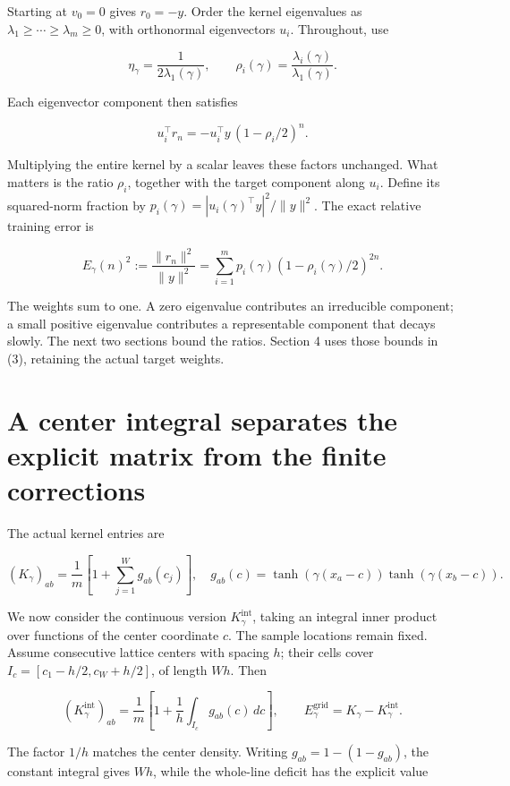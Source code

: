 \documentclass[11pt]{article}
\begin{document}
Starting at \(v_0=0\) gives \(r_0=-y\). Order the kernel eigenvalues as \(\lambda_1\ge\cdots\ge\lambda_m\ge0\), with orthonormal eigenvectors \(u_i\). Throughout, use

\[
\eta_\gamma=\frac1{2\lambda_1(\gamma)},
\qquad
\rho_i(\gamma)=\frac{\lambda_i(\gamma)}{\lambda_1(\gamma)}.
\]

Each eigenvector component then satisfies

\[
u_i^\top r_n=-u_i^\top y\,(1-\rho_i/2)^n.
\tag{2}
\]

Multiplying the entire kernel by a scalar leaves these factors unchanged. What matters is the ratio \(\rho_i\), together with the target component along \(u_i\). Define its squared-norm fraction by \(p_i(\gamma)=|u_i(\gamma)^\top y|^2/\|y\|^2\). The exact relative training error is

\[
\boxed{
E_\gamma(n)^2:=\frac{\|r_n\|^2}{\|y\|^2}
=\sum_{i=1}^m p_i(\gamma)(1-\rho_i(\gamma)/2)^{2n}.
}
\tag{3}
\]

The weights sum to one. A zero eigenvalue contributes an irreducible component; a small positive eigenvalue contributes a representable component that decays slowly. The next two sections bound the ratios. Section 4 uses those bounds in (3), retaining the actual target weights.

\section{A center integral separates the explicit matrix from the finite corrections}

The actual kernel entries are

\[
(K_\gamma)_{ab}=\frac1m\left[1+\sum_{j=1}^{W}g_{ab}(c_j)\right],
\quad
g_{ab}(c)=\tanh(\gamma(x_a-c))\tanh(\gamma(x_b-c)).
\]

We now consider the continuous version \(K_\gamma^{\mathrm{int}}\), taking an integral inner product over functions of the center coordinate \(c\). The sample locations remain fixed. Assume consecutive lattice centers with spacing \(h\); their cells cover \(I_c=[c_1-h/2,c_W+h/2]\), of length \(Wh\). Then

\[
(K_\gamma^{\mathrm{int}})_{ab}
=\frac1m\left[1+\frac1h\int_{I_c}g_{ab}(c)\,dc\right],
\qquad E_\gamma^{\mathrm{grid}}=K_\gamma-K_\gamma^{\mathrm{int}}.
\tag{4}
\]

The factor \(1/h\) matches the center density. Writing \(g_{ab}=1-(1-g_{ab})\), the constant integral gives \(Wh\), while the whole-line deficit has the explicit value
\end{document}
